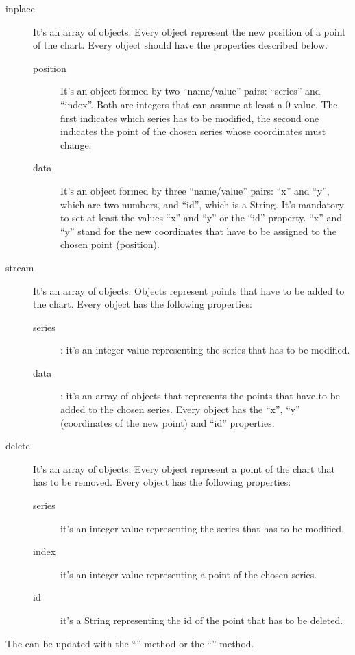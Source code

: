 				\begin{description}
					\item[inplace] It's an array of objects. Every object represent the new position of a point of the chart. Every object should have the properties described below.
					\begin{description}
						\item[position] It's an object formed by two “name/value” pairs: “series” and “index”. Both are integers that can assume at least a 0 value. The first indicates which series has to be modified, the second one indicates the point of the chosen series whose coordinates must change. 
						\item[data] It's an object formed by three “name/value” pairs: “x” and “y”, which are two numbers, and “id”, which is a String. It's mandatory to set at least the values “x” and “y” or the “id” property. “x” and “y” stand for the new coordinates that have to be assigned to the chosen point (position).
					\end{description}
					\item[stream] It's an array of objects. Objects represent points that have to be added to the chart. Every object has the following properties:
					\begin{description}
						\item[series]: it's an integer value representing the series that has to be modified.
						\item[data]: it's an array of objects that represents the points that have to be added to the chosen series. Every object has the “x”, “y” (coordinates of the new point) and “id” properties.
					\end{description}
					\item[delete] It's an array of objects. Every object represent a point of the chart that has to be removed. Every object has the following properties:
					\begin{description}
						\item[series] it's an integer value representing the series that has to be modified.
						\item[index] it's an integer value representing a point of the chosen series.
						\item[id] it's a String representing the id of the point that has to be deleted.
					\end{description}
				\end{description}
				The  can be updated with the “” method or the “” method.\\
